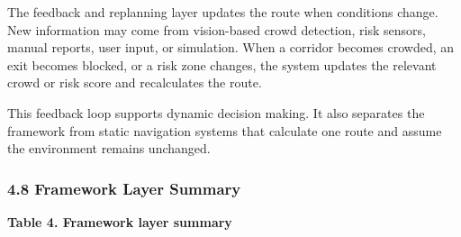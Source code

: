 \documentclass[
]{article}
\begin{document}
The feedback and replanning layer updates the route when conditions
change. New information may come from vision-based crowd detection, risk
sensors, manual reports, user input, or simulation. When a corridor
becomes crowded, an exit becomes blocked, or a risk zone changes, the
system updates the relevant crowd or risk score and recalculates the
route.

This feedback loop supports dynamic decision making. It also separates
the framework from static navigation systems that calculate one route
and assume the environment remains unchanged.

\subsubsection{4.8 Framework Layer
Summary}\label{framework-layer-summary}

\textbf{Table 4. Framework layer summary}
\end{document}
